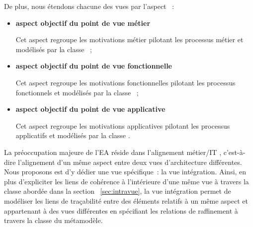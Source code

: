 De plus, nous étendons chacune des vues par l'aspect ~: 
\begin{itemize}

    \item \textbf{aspect objectif du point de vue métier}

Cet aspect regroupe les motivations métier pilotant les processus métier et modélisés
par la classe  ~;

    \item \textbf{aspect objectif du point de vue fonctionnelle}

Cet aspect regroupe les motivations fonctionnelles pilotant les processus fonctionnels
et modélisés par la classe  ~;

    \item \textbf{aspect objectif du point de vue applicative}

Cet aspect regroupe les motivations applicatives pilotant les processus applicatifs
et modélisés par la classe  .

\end{itemize}


La préoccupation majeure de l'EA réside dans l'alignement métier/IT \cite{kaisler_enterprise_2005},
c'est-à-dire l'alignement d'un même aspect entre deux vues d'architecture différentes.
Nous proposons est d'y dédier une vue spécifique~: la vue intégration.
Ainsi, en plus d'expliciter les liens de cohérence à l'intérieure d'une même vue
à travers la classe  abordée dans la section
~\ref{sec:intravue}, la vue intégration permet de modéliser les liens de traçabilité
entre des éléments relatifs à un même aspect et appartenant à des vues différentes en spécifiant les relations de
raffinement à travers la classe  du métamodèle.
 

